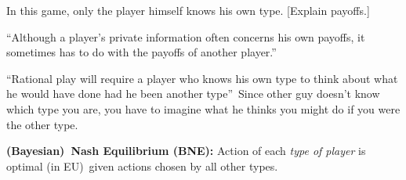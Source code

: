\documentclass[handout]{beamer}
\begin{document}
\begin{frame}%

In this game, only the player himself knows his own type. [Explain payoffs.]

\bigskip

\pause%
{\footnotesize \textquotedblleft Although a player's private information
often concerns his own payoffs, it sometimes has to do with the payoffs of
another player.\textquotedblright }

\bigskip

{\footnotesize \textquotedblleft Rational play will require a player who
knows his own type to think about what he would have done had he been
another type\textquotedblright\ Since other guy doesn't know which type you
are, you have to imagine what he thinks you might do if you were the other
type.}

\bigskip 
\end{frame}%

\begin{frame}%

\textbf{(Bayesian)\ Nash Equilibrium (BNE): }Action of each \textit{type of
player} is optimal (in EU)\ given actions chosen by all other types. \ 

\end{frame}%
\end{document}
